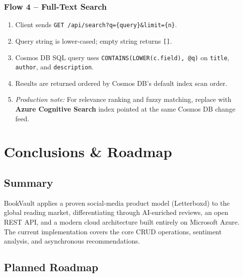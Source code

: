 \documentclass[12pt, a4paper]{report}
\begin{document}
\subsection{Flow 4 – Full-Text Search}

\begin{enumerate}[nosep]
  \item Client sends \texttt{GET /api/search?q=\{query\}\&limit=\{n\}}.
  \item Query string is lower-cased; empty string returns \texttt{[]}.
  \item Cosmos DB SQL query uses \texttt{CONTAINS(LOWER(c.field), @q)} on
    \texttt{title}, \texttt{author}, and \texttt{description}.
  \item Results are returned ordered by Cosmos DB's default index scan order.
  \item \textit{Production note:} For relevance ranking and fuzzy matching, replace with
    \textbf{Azure Cognitive Search} index pointed at the same Cosmos DB change feed.
\end{enumerate}

\chapter{Conclusions \& Roadmap}

\section{Summary}

BookVault applies a proven social-media product model (Letterboxd) to the global reading
market, differentiating through AI-enriched reviews, an open REST API, and a modern cloud
architecture built entirely on Microsoft Azure.  The current implementation covers the
core CRUD operations, sentiment analysis, and asynchronous recommendations.

\section{Planned Roadmap}
\end{document}
